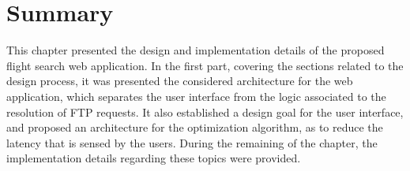 \section{Summary}
\label{sec:summary_sd}

This chapter presented the design and implementation details of the proposed flight search web application. In the first part, covering the sections related to the design process, it was presented the considered architecture for the web application, which separates the user interface from the logic associated to the resolution of FTP requests. It also established a design goal for the user interface, and proposed an architecture for the optimization algorithm, as to reduce the latency that is sensed by the users. During the remaining of the chapter, the implementation details regarding these topics were provided.